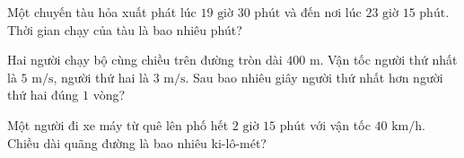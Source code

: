 \begin{ex}
  Một chuyến tàu hỏa xuất phát lúc $19\text{ giờ } 30\text{ phút}$ và đến nơi lúc $23\text{ giờ } 15\text{ phút}$. Thời gian chạy của tàu là bao nhiêu phút?
\end{ex}

\begin{ex}
  Hai người chạy bộ cùng chiều trên đường tròn dài $400\text{ m}$. Vận tốc người thứ nhất là $5\text{ m/s}$, người thứ hai là $3\text{ m/s}$. Sau bao nhiêu giây người thứ nhất hơn người thứ hai đúng $1$ vòng?
\end{ex}

\begin{ex}
  Một người đi xe máy từ quê lên phố hết $2\text{ giờ } 15\text{ phút}$ với vận tốc $40\text{ km/h}$. Chiều dài quãng đường là bao nhiêu ki-lô-mét?
\end{ex}
